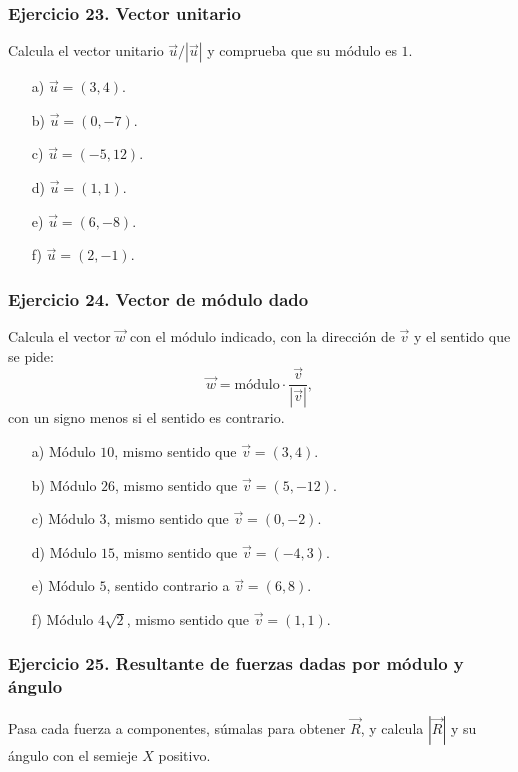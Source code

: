 \subsubsection*{Ejercicio 23. Vector unitario}

Calcula el vector unitario $\vec{u}/|\vec{u}|$ y comprueba que su módulo es $1$.

\begin{enumerate}
    \item[a)] $\vec{u}=(3,4)$.
    \item[b)] $\vec{u}=(0,-7)$.
    \item[c)] $\vec{u}=(-5,12)$.
    \item[d)] $\vec{u}=(1,1)$.
    \item[e)] $\vec{u}=(6,-8)$.
    \item[f)] $\vec{u}=(2,-1)$.
\end{enumerate}

\subsubsection*{Ejercicio 24. Vector de módulo dado}

Calcula el vector $\vec{w}$ con el módulo indicado, con la dirección de $\vec{v}$ y el sentido que se pide:
\[
\vec{w}=\mbox{módulo}\cdot\frac{\vec{v}}{|\vec{v}|},
\]
con un signo menos si el sentido es contrario.

\begin{enumerate}
    \item[a)] Módulo $10$, mismo sentido que $\vec{v}=(3,4)$.
    \item[b)] Módulo $26$, mismo sentido que $\vec{v}=(5,-12)$.
    \item[c)] Módulo $3$, mismo sentido que $\vec{v}=(0,-2)$.
    \item[d)] Módulo $15$, mismo sentido que $\vec{v}=(-4,3)$.
    \item[e)] Módulo $5$, sentido contrario a $\vec{v}=(6,8)$.
    \item[f)] Módulo $4\sqrt{2}$, mismo sentido que $\vec{v}=(1,1)$.
\end{enumerate}

\subsubsection*{Ejercicio 25. Resultante de fuerzas dadas por módulo y ángulo}

Pasa cada fuerza a componentes, súmalas para obtener $\vec{R}$, y calcula $|\vec{R}|$ y su ángulo con el semieje $X$ positivo.

